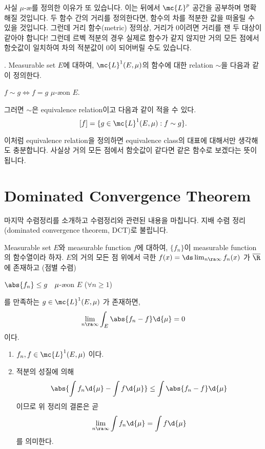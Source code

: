 사실 \(\mu\)-\ae 를 정의한 이유가 또 있습니다. 이는 뒤에서 \(\mc{L}^p\) 공간을 공부하며 명확해질 것입니다. 두 함수 간의 거리를 정의한다면, 함수의 차를 적분한 값을 떠올릴 수 있을 것입니다. 그런데 거리 함수(metric) 정의상, 거리가 0이려면 거리를 잰 두 대상이 같아야 합니다! 그런데 르벡 적분의 경우 실제로 함수가 같지 않지만 거의 모든 점에서 함숫값이 일치하여 차의 적분값이 0이 되어버릴 수도 있습니다.

. Measurable set \(E\)에 대하여, \(\mc{L}^{1}(E, \mu)\)의 함수에 대한 relation \(\sim\)을 다음과 같이 정의한다.
\begin{center}
    \(f \sim g \iff f = g\) \(\mu\)-\ae on \(E\).
\end{center}
그러면 \(\sim\)은 equivalence relation이고 다음과 같이 적을 수 있다.
\[
    [f] = \{g \in \mc{L}^{1}(E, \mu) : f \sim g\}.
\]

이처럼 equivalence relation을 정의하면 equivalence class의 대표에 대해서만 생각해도 충분합니다. 사실상 거의 모든 점에서 함숫값이 같다면 같은 함수로 보겠다는 뜻이 됩니다.

\section*{Dominated Convergence Theorem}

마지막 수렴정리를 소개하고 수렴정리와 관련된 내용을 마칩니다. 지배 수렴 정리(dominated convergence theorem, DCT)로 불립니다.

  Measurable set \(E\)와 measurable function \(f\)에 대하여, \(\{f_n\}\)이 measurable function의 함수열이라 하자. \(E\)의 거의 모든 점 위에서 극한 \(f(x) = \ds \lim_{n \ra \infty} f_n(x)\) 가 \(\overline{\R}\)에 존재하고 (점별 수렴)
\begin{center}
    \(\abs{f_n} \leq g \quad \mu\)-\ae on \(E\) (\(\forall n \geq 1\))
\end{center}
를 만족하는 \(g \in \mc{L}^{1}(E, \mu)\) 가 존재하면,
\[
    \lim_{n \ra \infty} \int_E \abs{f_n - f} \d{\mu} = 0
\]
이다.

\rmk
\begin{enumerate}
    \item \(f_n, f \in \mc{L}^{1}(E, \mu)\) 이다.
    \item 적분의 성질에 의해
          \[
              \abs{\int f_n \d{\mu} - \int f \d{\mu}} \leq \int \abs{f_n - f} \d{\mu}
          \]
          이므로 위 정리의 결론은 곧
          \[
              \lim_{n \ra \infty} \int f_n \d{\mu} = \int f \d{\mu}
          \]
          를 의미한다.
\end{enumerate}

